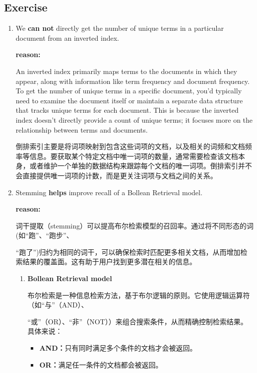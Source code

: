 \documentclass{article}
\begin{document}
\subsection{Exercise}
\begin{enumerate}
    \item We \textbf{can not} directly get the number of unique terms in a particular document from an inverted index.\par
    \textbf{reason:}\par
    An inverted index primarily maps terms to the documents in which they appear, along with information like term frequency and document frequency. To get the number of unique terms in a specific document, you'd typically need to examine the document itself or maintain a separate data structure that tracks unique terms for each document. This is because the inverted index doesn't directly provide a count of unique terms; it focuses more on the relationship between terms and documents.\par
    倒排索引主要是将词项映射到包含这些词项的文档，以及相关的词频和文档频率等信息。要获取某个特定文档中唯一词项的数量，通常需要检查该文档本身，或者维护一个单独的数据结构来跟踪每个文档的唯一词项。倒排索引并不会直接提供唯一词项的计数，而是更关注词项与文档之间的关系。\par
    \item Stemming \textbf{helps} improve recall of a Bollean Retrieval model.\par
    \textbf{reason:}\par
    词干提取（stemming）可以提高布尔检索模型的召回率。通过将不同形态的词(如“跑”、“跑步”、\par
    “跑了”)归约为相同的词干，可以确保检索时匹配更多相关文档，从而增加检索结果的覆盖面。这有助于用户找到更多潜在相关的信息。\par
    \begin{enumerate}
        \item \textbf{Bollean Retrieval model}\par
        布尔检索是一种信息检索方法，基于布尔逻辑的原则。它使用逻辑运算符（如“与”（AND）、\par
        “或”（OR）、“非”（NOT））来组合搜索条件，从而精确控制检索结果。具体来说：\par
        \begin{itemize}
            \item \textbf{AND：}只有同时满足多个条件的文档才会被返回。
            \item \textbf{OR：}满足任一条件的文档都会被返回。

\end{itemize}
\end{enumerate}
\end{enumerate}
\end{document}
